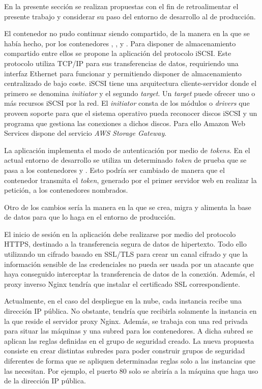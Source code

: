 En la presente sección se realizan propuestas con el fin de retroalimentar el presente trabajo y considerar su paso del entorno de desarrollo al de producción.

El contenedor  no pudo continuar siendo compartido, de la manera en la que se había hecho, por los contenedores , ,  y . Para disponer de almacenamiento compartido entre ellos se propone la aplicación del protocolo iSCSI. Este protocolo utiliza TCP/IP para sus transferencias de datos, requiriendo una interfaz Ethernet para funcionar y permitiendo disponer de almacenamiento centralizado de bajo coste. iSCSI tiene una arquitectura cliente-servidor donde el primero se denomina \textit{initiator} y el segundo \textit{target}. Un \textit{target} puede ofrecer uno o más recursos iSCSI por la red. El \textit{initiator} consta de los módulos o \textit{drivers} que proveen soporte para que el sistema operativo pueda reconocer discos iSCSI y un programa que gestiona las conexiones a dichos discos. Para ello Amazon Web Services dispone del servicio \textit{AWS Storage Gateway}.

La aplicación implementa el modo de autenticación por medio de \textit{tokens}. En el actual entorno de desarrollo se utiliza un determinado \textit{token} de prueba que se pasa a los contenedores  y . Esto podría ser cambiado de manera que el contenedor  transmita el \textit{token}, generado por el primer servidor web en realizar la petición, a los contenedores nombrados.

Otro de los cambios sería la manera en la que se crea, migra y alimenta la base de datos para que lo haga en el entorno de producción. 

El inicio de sesión en la aplicación debe realizarse por medio del protocolo HTTPS, destinado a la transferencia segura de datos de hipertexto. Todo ello utilizando un cifrado basado en SSL/TLS para crear un canal cifrado y que la información sensible de las credenciales no pueda ser usada por un atacante que haya conseguido interceptar la transferencia de datos de la conexión. Además, el proxy inverso Nginx tendría que instalar el certificado SSL correspondiente.

Actualmente, en el caso del despliegue en la nube, cada instancia recibe una dirección IP pública. No obstante, tendría que recibirla solamente la instancia en la que reside el servidor proxy Nginx. Además, se trabaja con una red privada para situar las máquinas y una subred para los contenedores. A dicha subred se aplican las reglas definidas en el grupo de seguridad creado. La nueva propuesta consiste en crear distintas subredes para poder construir grupos de seguridad diferentes de forma que se apliquen determinadas reglas solo a las instancias que las necesitan. Por ejemplo, el puerto 80 solo se abriría a la máquina que haga uso de la dirección IP pública.

